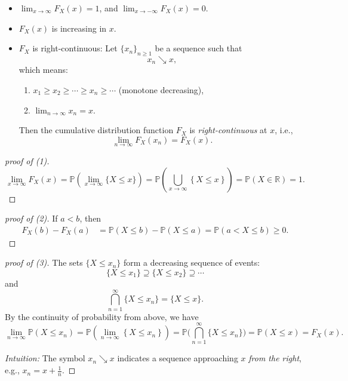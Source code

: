 \begin{proposition}
    \hfill 
    \begin{itemize}
        \item [(1)] \(\lim_{x \to \infty} F_X(x) = 1 \), and \(\lim_{x \to -\infty} F_X(x) = 0 \). 
        \item [(2)] \(F_X(x)\) is increasing in \(x\). 
        \item [(3)] \(F_X\) is right-continuous: Let $\{x_n\}_{n\ge 1}$ be a sequence such that
        \[
        x_n \searrow x,
        \]
        which means:
        \begin{enumerate}
            \item $x_1 \ge x_2 \ge \cdots \ge x_n \ge \cdots$ (monotone decreasing),
            \item $\displaystyle \lim_{n\to\infty} x_n = x$.
        \end{enumerate}

        Then the cumulative distribution function $F_X$ is \emph{right-continuous} at $x$, i.e.,
        \[
        \lim_{n\to\infty} F_X(x_n) = F_X(x).
        \]     
    \end{itemize}
\end{proposition}

\begin{proof}[proof of (1)]
    \[
        \lim_{x \to \infty} F_X(x) = \mathbb{P} \left( \lim_{x \to \infty} \{X \le x\}  \right) = \mathbb{P} \left( \bigcup_{x \to \infty} \left\{ X \le x \right\}   \right) = \mathbb{P} (X \in \mathbb{R}) = 1.   
    \]
\end{proof}

\begin{proof}[proof of (2)]
    If \(a < b\), then 
    \begin{align*}
        F_X(b) - F_X(a) &= \mathbb{P} (X \le b) - \mathbb{P} (X \le a) = \mathbb{P} (a < X \le b) \ge 0.
    \end{align*} 
\end{proof}

\begin{proof}[proof of (3)]
    The sets $\{X \le x_n\}$ form a decreasing sequence of events:
    \[
    \{X \le x_1\} \supseteq \{X \le x_2\} \supseteq \cdots
    \]
    and
    \[
    \bigcap_{n=1}^{\infty} \{X \le x_n\} = \{X \le x\}.
    \]
    By the continuity of probability from above, we have
    \[
    \lim_{n\to\infty} \mathbb{P} (X \le x_n) = \mathbb{P} \left( \lim_{n \to \infty} \left\{ X \le x_n \right\}   \right)  = \mathbb{P} \Big(\bigcap_{n=1}^{\infty} \{X \le x_n\}\Big) = \mathbb{P} (X \le x) = F_X(x).
    \]

    \noindent
    \emph{Intuition:} The symbol $x_n \searrow x$ indicates a sequence approaching $x$ \emph{from the right}, e.g., $x_n = x + \frac{1}{n}$.
\end{proof}

